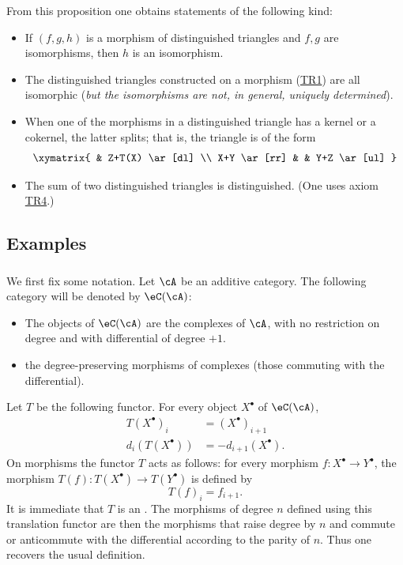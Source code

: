 From this proposition one obtains statements of the following kind:
\begin{itemize}
  \item If $(f,g,h)$ is a morphism of distinguished triangles and $f,g$
    are isomorphisms, then $h$ is an isomorphism.
  \item The distinguished triangles constructed on a morphism
    (\hyperlink{VIII:TR1}{TR1}) are all isomorphic (\emph{but the
    isomorphisms are not, in general, uniquely determined}).
  \item When one of the morphisms in a distinguished triangle has a kernel
    or a cokernel, the latter splits; that is, the triangle is of the form
    \[\xymatrix{
      & Z+T(X) \ar[dl] \\
      X+Y \ar[rr]
        & & Y+Z \ar[ul]
    }\]
  \item The sum of two distinguished triangles is distinguished. (One uses
    axiom \hyperlink{VIII:TR4}{TR4}.)
\end{itemize}

\subsection{Examples}\label{VIII:1-2}

\subsubsection{}\label{VIII:1-2-1}

We first fix some notation. Let $\cA$ be an additive category.
The following category will be denoted by $\eC(\cA)$:
\begin{itemize}
  \item The objects of $\eC(\cA)$ are the complexes of $\cA$, with no
    restriction on degree and with differential of degree $+1$.
  \item {} the degree-preserving morphisms of
    complexes (those commuting with the differential).
\end{itemize}

Let $T$ be the following functor. For every object $X^\bullet$ of
$\eC(\cA)$,
\begin{align*}
  T(X^\bullet)_i &= (X^\bullet)_{i+1} \\
  d_i(T(X^\bullet)) &= -d_{i+1}(X^\bullet)  \text{.}
\end{align*}
On morphisms the functor $T$ acts as follows: for every morphism
$f:X^\bullet \to Y^\bullet$, the morphism
$T(f):T(X^\bullet) \to T(Y^\bullet)$ is defined by
\[
  T(f)_i = f_{i+1} \text{.}
\]
It is immediate that $T$ is an .
The morphisms of degree $n$ defined using this translation functor are
then the morphisms that raise degree by $n$ and commute or anticommute
with the differential according to the parity of $n$. Thus one recovers
the usual definition.

